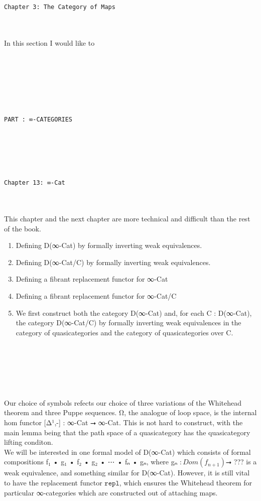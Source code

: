 \documentclass{book}
\theoremstyle{definition}
\newcounter{pcounter}
\newcounter{sectioncount}
\newcounter{subsectioncount}
\renewcommand{\section}[1]{\newpage\ \\ \ \\ \begin{center} \scalebox{1.5}{\texttt{\thesectioncount . #1}} \stepcounter{sectioncount} \setcounter{subsectioncount}{1} \end{center} \begin{center} \ \\ \ \\ \thispagestyle{empty} \end{center}}
\renewcommand{\chapter}[1]{
\newpage
{
\Huge 
\begin{center}
\ \\
\ \\
\thispagestyle{empty}
\texttt{#1}
\end{center}}
\ \\
\ \\
}
\newcounter{partcount}
\renewcommand{\part}[1]{
\newpage
{
\Huge 
\begin{center}
\ \\
\ \\
\ \\
\ \\
\ \\
\ \\
\thispagestyle{empty}
\texttt{PART {\thepartcount}: #1}
\stepcounter{partcount}
\end{center}}
\ \\
\ \\
}
\begin{document}
\chapter{Chapter 3: The Category of Maps}

In this section I would like to 






\part{∞-CATEGORIES}

\chapter{Chapter 13: ∞\texttt{-Cat}}

This chapter and the next chapter are more technical and difficult than the rest of the book.\\

\begin{enumerate}
\item Defining D(∞-Cat) by formally inverting weak equivalences.
\item Defining D(∞-Cat/C) by formally inverting weak equivalences.
\item Defining a fibrant replacement functor for ∞-Cat
\item Defining a fibrant replacement functor for ∞-Cat/C
\item We first construct both the category D(∞-Cat) and, for each C : D(∞-Cat), the category D(∞-Cat/C) by formally inverting weak equivalences in the category of quasicategories and the category of quasicategories over C.
\end{enumerate}

\section{Ω⃗}

Our choice of symbols refects our choice of three variations of the Whitehead theorem and three Puppe sequences. Ω⃗, the analogue of loop space, is the internal hom functor [Δ¹,-] : ∞-Cat ⭢ ∞-Cat. This is not hard to construct, with the main lemma being that the path space of a quasicategory has the quasicategory lifting conditon.\\

We will be interested in one formal model of D(∞-Cat) which consists of formal compositions f₁ • g₁ • f₂ • g₂ • ⋯ • fₙ • gₙ, where gₙ $: Dom(f{}_{n+1}) $⭢ ??? is a weak equivalence, and something similar for D(∞-Cat). However, it is still vital to have the replacement functor $\texttt{repl}$, which ensures the Whitehead theorem for particular ∞-categories which are constructed out of attaching maps.\\
\end{document}
